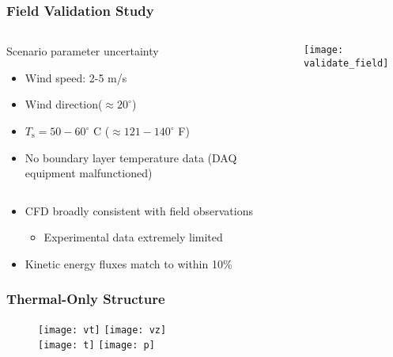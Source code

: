 \documentclass[mathserif]{beamer}
\begin{document}
%
%
%
\begin{frame}
\frametitle{Field Validation Study}
 
\begin{columns}[]
  \begin{column}{0.52\linewidth}
   \begin{block}{Scenario parameter uncertainty}
    \begin{itemize}
     \item Wind speed: 2-5 m/s
     \item Wind direction($\approx20^{\circ}$)
     \item $T_{\text{s}} = 50-60^{\circ}$ C ($\approx 121-140^{\circ}$ F)
     \item No boundary layer temperature data 
	   (DAQ equipment malfunctioned)
    \end{itemize}
   \end{block}
  \end{column}

  \begin{column}{0.49\linewidth}

   \begin{center}
    \texttt{[image: validate\_field]}
   \end{center}
  \end{column}
 \end{columns}

 \begin{center}
  \begin{itemize}
   \item CFD broadly consistent with field observations
	 \begin{itemize}
	  \item Experimental data extremely limited
	 \end{itemize}
   \item Kinetic energy fluxes match to within 10\%
  \end{itemize}
  \end{center}

\end{frame}


%
%
%
\begin{frame}
\frametitle{Thermal-Only Structure}

\begin{figure}[!htb]
  \centering
  \texttt{[image: vt]}
  \hfill
  \texttt{[image: vz]}
  \\
  \texttt{[image: t]}
  \hfill
  \texttt{[image: p]}
\end{figure}


\end{frame}
\end{document}
